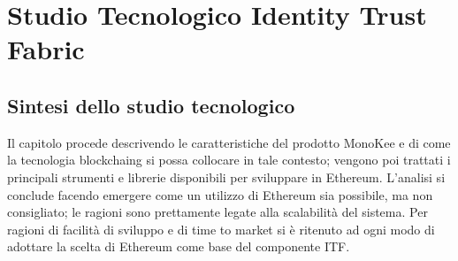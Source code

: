 \section{Studio Tecnologico Identity Trust Fabric}

\subsection{Sintesi dello studio tecnologico}
Il capitolo procede descrivendo le caratteristiche del prodotto MonoKee e di come la tecnologia \gls{blockchaing} si possa collocare in tale contesto; vengono poi trattati i principali strumenti e librerie disponibili per sviluppare in Ethereum. L’analisi si conclude facendo emergere come un utilizzo di Ethereum sia possibile, ma non consigliato; le ragioni sono prettamente legate alla scalabilità del sistema. Per ragioni di facilità di sviluppo e di time to market si è ritenuto ad ogni modo di adottare la scelta di Ethereum come base del componente ITF.

